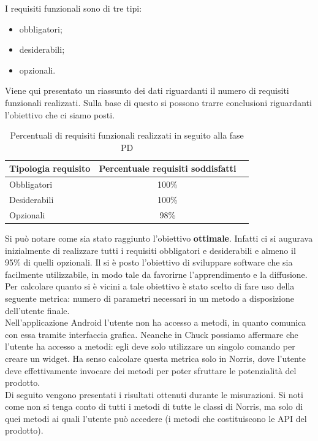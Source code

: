 				I requisiti funzionali sono di tre tipi:
				\begin{itemize}
					\item obbligatori;
					\item desiderabili;
					\item opzionali.
				\end{itemize}
				Viene qui presentato un riassunto dei dati riguardanti il numero di requisiti funzionali realizzati. Sulla base di questo si possono trarre conclusioni riguardanti l'obiettivo che ci siamo posti.
				\begin{table}[H]
					\centering
					\begin{tabu}{| l | c | c |}
						\hline
						Tipologia requisito   & Percentuale requisiti soddisfatti \\ \hline \hline
						Obbligatori           & 100\% \\ \hline
						Desiderabili          & 100\% \\ \hline
						Opzionali             & 98\% \\ \hline
					\end{tabu}
					\caption{Percentuali di requisiti funzionali realizzati in seguito alla fase PD}
				\end{table}
				Si può notare come sia stato raggiunto l'obiettivo \textbf{ottimale}. Infatti ci si augurava inizialmente di realizzare tutti i requisiti obbligatori e desiderabili e almeno il 95\% di quelli opzionali.
				Il \groupname si è posto l'obiettivo di sviluppare software che sia facilmente utilizzabile, in modo tale da favorirne l'apprendimento e la diffusione. Per calcolare quanto si è vicini a tale obiettivo è stato scelto di fare uso della seguente metrica: numero di parametri necessari in un metodo a disposizione dell'utente finale.\\
				Nell'applicazione Android l'utente non ha accesso a metodi, in quanto comunica con essa tramite interfaccia grafica. Neanche in Chuck possiamo affermare che l'utente ha accesso a metodi: egli deve solo utilizzare un singolo comando per creare un widget. Ha senso calcolare questa metrica solo in Norris, dove l'utente deve effettivamente invocare dei metodi per poter sfruttare le potenzialità del prodotto.\\
				Di seguito vengono presentati i risultati ottenuti durante le misurazioni. Si noti come non si tenga conto di tutti i metodi di tutte le classi di Norris, ma solo di quei metodi ai quali l'utente può accedere (i metodi che costituiscono le API del prodotto).\\
